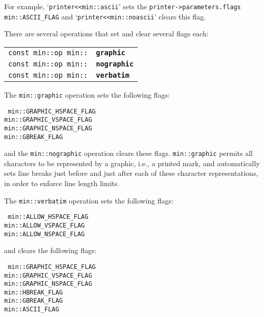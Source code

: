\documentclass[12pt]{article}
\makeatletter
\newcommand{\ttindex}[1]{\index{#1@{\tt #1}}}
\newcommand{\minindex}[1]{\ttindex{min::#1}\ttindex{#1}}
\newcommand{\EOL}{\penalty \exhyphenpenalty}
\newenvironment{indpar}[1][0.3in]%
	{\begin{list}{}%
		     {\setlength{\itemsep}{0in}%
		      \setlength{\topsep}{0in}%
		      \setlength{\parsep}{1ex}%
		      \setlength{\labelwidth}{#1}%
		      \setlength{\leftmargin}{#1}%
		      \addtolength{\leftmargin}{\labelsep}}%
	 \item}%
	{\end{list}}
\newcommand{\LABEL}[1]{\label{#1}}
\newcommand{\MINKEY}[1]{{\tt \bf #1}\minindex{#1}}
\makeatother
\begin{document}
For example, `{\tt printer<<min::ascii}' sets the
{\tt printer->\EOL parameters.flags} {\tt min::\EOL ASCII\_\EOL FLAG}
and `{\tt printer<<\EOL min::\EOL noascii}' clears this flag.

There are several operations that set and clear several flags each:

\begin{indpar}[1em]\begin{tabular}{r@{}l}
\verb|const min::op min::| & \MINKEY{graphic}
\LABEL{MIN::GRAPHIC} \\
\verb|const min::op min::| & \MINKEY{nographic}
\LABEL{MIN::NOGRAPHIC} \\
\verb|const min::op min::| & \MINKEY{verbatim}
\LABEL{MIN::VERBATIM} \\
\end{tabular}\end{indpar}

The {\tt min::\EOL graphic} operation sets the following flags:
\begin{indpar}
\tt
min::GRAPHIC\_HSPACE\_FLAG \\
min::GRAPHIC\_VSPACE\_FLAG \\
min::GRAPHIC\_NSPACE\_FLAG \\
min::GBREAK\_FLAG
\end{indpar}

and the {\tt min::\EOL nographic} operation clears these flags.
{\tt min::\EOL graphic} permits all characters to be represented
by a graphic, i.e., a printed mark, and automatically sets line breaks
just before
and just after each of these character representations, in order to
enforce line length limits.

The {\tt min::\EOL verbatim} operation sets the following flags:
\begin{indpar}
\tt
min::ALLOW\_HSPACE\_FLAG \\
min::ALLOW\_VSPACE\_FLAG \\
min::ALLOW\_NSPACE\_FLAG
\end{indpar}

and clears the following flags:
\begin{indpar}
\tt
min::GRAPHIC\_HSPACE\_FLAG \\
min::GRAPHIC\_VSPACE\_FLAG \\
min::GRAPHIC\_NSPACE\_FLAG \\
min::HBREAK\_FLAG \\
min::GBREAK\_FLAG \\
min::ASCII\_FLAG
\end{indpar}
\end{document}
